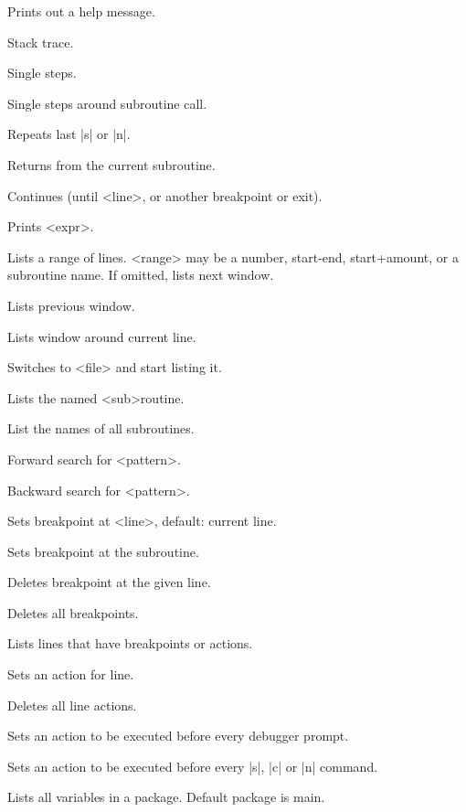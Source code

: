 \begin{enum}{2.5cm}

Prints out a help message.

Stack trace.

Single steps.

Single steps around subroutine call.

Repeats last |s| or |n|.

Returns from the current subroutine.

Continues (until <line>, or another breakpoint or exit).

Prints <expr>.

Lists a range of lines. <range> may be a number, start-end,
start+amount, or a subroutine name. If omitted, lists next window. 

\Xi{|-|}
Lists previous window.

Lists window around current line.

Switches to <file> and start listing it.

Lists the named <sub>routine.

List the names of all subroutines.

Forward search for <pattern>.

Backward search for <pattern>.

Sets breakpoint at <line>, default: current line.

Sets breakpoint at the subroutine.

Deletes breakpoint at the given line.

Deletes all breakpoints.

Lists lines that have breakpoints or actions.

Sets an action for line.

Deletes all line actions.

Sets an action to be executed before every debugger prompt.

Sets an action to be executed before every |s|, |c| or |n| command.

Lists all variables in a package. Default package is main.


\end{enum}
